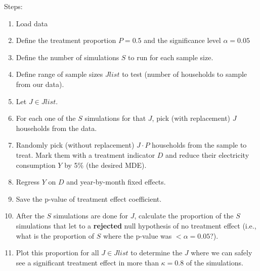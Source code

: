 \documentclass[12pt]{article}
\begin{document}
\newpage
{}

Steps:
\begin{enumerate}
    \item Load data
    \item Define the treatment proportion $P=0.5$ and the significance level $\alpha = 0.05$
    \item Define the number of simulations $S$ to run for each sample size.
    \item Define range of sample sizes $Jlist$ to test (number of households to sample from our data).
    \item Let $J\in Jlist$.
    \item For each one of the $S$ simulations for that $J$, pick (with replacement) $J$ households from the data.
    \item Randomly pick (without replacement) $J\cdot P$ households from the sample to treat. Mark them with a treatment indicator $D$ and reduce their electricity consumption $Y$ by 5\% (the desired MDE).
    \item Regress $Y$ on $D$ and year-by-month fixed effects.
    \item Save the p-value of treatment effect coefficient.
    \item After the $S$ simulations are done for $J$, calculate the proportion of the $S$ simulations that let to a \textbf{rejected} null hypothesis of no treatment effect (i.e., what is the proportion of $S$ where the p-value was $< \alpha=0.05$?).
    \item Plot this proportion for all $J\in Jlist$ to determine the $J$ where we can safely see a significant treatment effect in more than $\kappa = 0.8$ of the simulations.
\end{enumerate}
\end{document}
